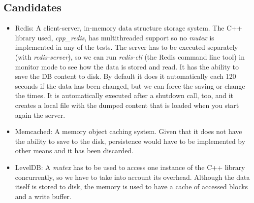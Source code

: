 \documentclass[12pt]{article}
\begin{document}
\subsection{Candidates}
\begin{itemize}
    \item Redis: A client-server, in-memory data structure storage system. The C++ library used, \textit{cpp\_redis}, has multithreaded support so no \textit{mutex} is implemented in any of the tests. The server has to be executed separately (with \textit{redis-server}), so we can run \textit{redis-cli} (the Redis command line tool) in monitor mode to see how the data is stored and read. It has the ability to save the DB content to disk. By default it does it automatically each 120 seconds if the data has been changed, but we can force the saving or change the times. It is automatically executed after a shutdown call, too, and it creates a local file with the dumped content that is loaded when you start again the server.
    
    \item Memcached: A memory object caching system. Given that it does not have the ability to save to the disk, persistence would have to be implemented by other means and it has been discarded.
    \item LevelDB: %
    A \textit{mutex} has to be used to access one instance of the C++ library concurrently, so we have to take into account its overhead. Although the data itself is stored to disk, the memory is used to have a cache of accessed blocks and a write buffer.
    

\end{itemize}
\end{document}
